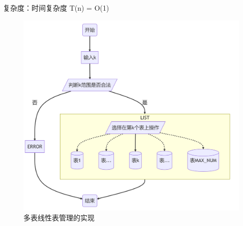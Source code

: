 \documentclass[supercite]{Experimental_Report}
\theoremstyle{definition}
\begin{document}
\begin{enumerate}
	复杂度：时间复杂度 T(n) = O(1)
	\begin{figure}[H]
	\centering
	\begin{minipage}{0.8\linewidth}
		\centering
		\includegraphics[width=0.9\linewidth]{images/多表管理.png}
	\end{minipage}
	\caption{多表线性表管理的实现}
	\label{fig1-7}
	\end{figure}
	\newpage
	
\end{enumerate}
\end{document}
